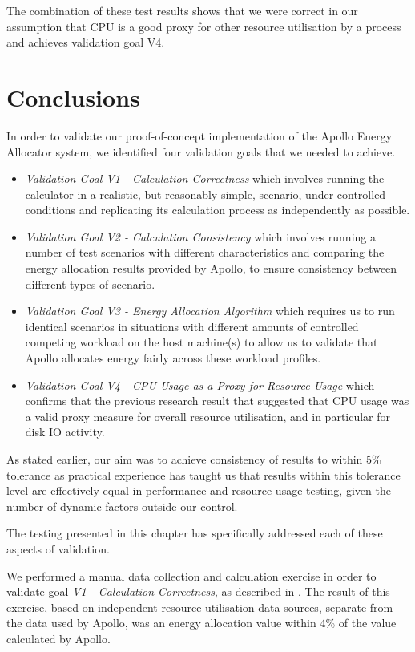 The combination of these test results shows that we were correct in our assumption that CPU is a good proxy for other resource utilisation by a process and achieves validation goal V4.

\section{Conclusions}

In order to validate our proof-of-concept implementation of the Apollo Energy Allocator system, we identified four validation goals that we needed to achieve.

\begin{itemize}
	\item \textit{Validation Goal V1 - Calculation Correctness} which involves running the calculator in a realistic, but reasonably simple, scenario, under controlled conditions and replicating its calculation process as independently as possible.
	\item \textit{Validation Goal V2 - Calculation Consistency} which involves running a number of test scenarios with different characteristics and comparing the energy allocation results provided by Apollo, to ensure consistency between different types of scenario.
	\item \textit{Validation Goal V3 - Energy Allocation Algorithm} which requires us to run identical scenarios in situations with different amounts of controlled competing workload on the host machine(s) to allow us to validate that Apollo allocates energy fairly across these workload profiles.
	\item \textit{Validation Goal V4 - CPU Usage as a Proxy for Resource Usage} which confirms that the previous research result that suggested that CPU usage was a valid proxy measure for overall resource utilisation, and in particular for disk IO activity.
\end{itemize}

As stated earlier, our aim was to achieve consistency of results to within 5\% tolerance as practical experience has taught us that results within this tolerance level are effectively equal in performance and resource usage testing, given the number of dynamic factors outside our control.

The testing presented in this chapter has specifically addressed each of these aspects of validation.

We performed a manual data collection and calculation exercise in order to validate goal \textit{V1 - Calculation Correctness}, as described in .  The result of this exercise, based on independent resource utilisation data sources, separate from the data used by Apollo, was an energy allocation value within 4\%  of the value calculated by Apollo.

